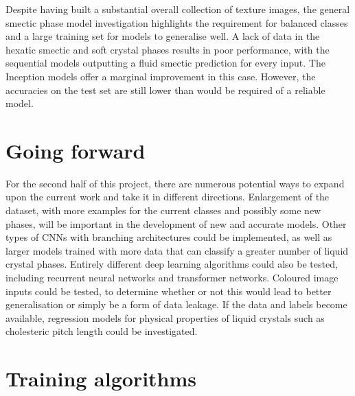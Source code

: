 \documentclass[12pt]{article}
\begin{document}
Despite having built a substantial overall collection of texture images, the general smectic phase model investigation highlights the requirement for balanced classes and a large training set for models to generalise well. A lack of data in the hexatic smectic and soft crystal phases results in poor performance, with the sequential models outputting a fluid smectic prediction for every input. The Inception models offer a marginal improvement in this case. However, the accuracies on the test set are still lower than would be required of a reliable model.
\section{Going forward}
For the second half of this project, there are numerous potential ways to expand upon the current work and take it in different directions. Enlargement of the dataset, with more examples for the current classes and possibly some new phases, will be important in the development of new and accurate models. Other types of CNNs with branching architectures could be implemented, as well as larger models trained with more data that can classify a greater number of liquid crystal phases. Entirely different deep learning algorithms could also be tested, including recurrent neural networks and transformer networks. Coloured image inputs could be tested, to determine whether or not this would lead to better generalisation or simply be a form of data leakage. If the data and labels become available, regression models for physical properties of liquid crystals such as cholesteric pitch length could be investigated.



\appendix
\appendixpage
\section{Training algorithms}
\end{document}
